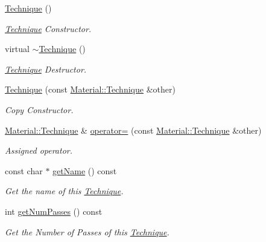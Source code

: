 \begin{DoxyCompactItemize}
\item 
\hyperlink{class_i_dream_sky_1_1_material_1_1_technique_a5c376b57ddf4afd862e409c6ee21235b}{Technique} ()
\begin{DoxyCompactList}\small\item\em \hyperlink{class_i_dream_sky_1_1_material_1_1_technique}{Technique} Constructor. \end{DoxyCompactList}\item 
virtual \hyperlink{class_i_dream_sky_1_1_material_1_1_technique_aac4f42459281e674556d5ada7df96a15}{$\sim$\+Technique} ()
\begin{DoxyCompactList}\small\item\em \hyperlink{class_i_dream_sky_1_1_material_1_1_technique}{Technique} Destructor. \end{DoxyCompactList}\item 
\hyperlink{class_i_dream_sky_1_1_material_1_1_technique_ac20b220f353315874aab2e39de7871b5}{Technique} (const \hyperlink{class_i_dream_sky_1_1_material_1_1_technique}{Material\+::\+Technique} \&other)
\begin{DoxyCompactList}\small\item\em Copy Constructor. \end{DoxyCompactList}\item 
\hyperlink{class_i_dream_sky_1_1_material_1_1_technique}{Material\+::\+Technique} \& \hyperlink{class_i_dream_sky_1_1_material_1_1_technique_a7441f54066a1acfdfdf5b4ba1c8fe06d}{operator=} (const \hyperlink{class_i_dream_sky_1_1_material_1_1_technique}{Material\+::\+Technique} \&other)
\begin{DoxyCompactList}\small\item\em Assigned operator. \end{DoxyCompactList}\item 
const char $\ast$ \hyperlink{class_i_dream_sky_1_1_material_1_1_technique_a79eea9e5f8d8a95120441a522a6b64df}{get\+Name} () const 
\begin{DoxyCompactList}\small\item\em Get the name of this \hyperlink{class_i_dream_sky_1_1_material_1_1_technique}{Technique}. \end{DoxyCompactList}\item 
int \hyperlink{class_i_dream_sky_1_1_material_1_1_technique_a6d2d42e9b76fcf40dd7fd0ac26955d40}{get\+Num\+Passes} () const 
\begin{DoxyCompactList}\small\item\em Get the Number of Passes of this \hyperlink{class_i_dream_sky_1_1_material_1_1_technique}{Technique}. \end{DoxyCompactList}\item 

\end{DoxyCompactItemize}
